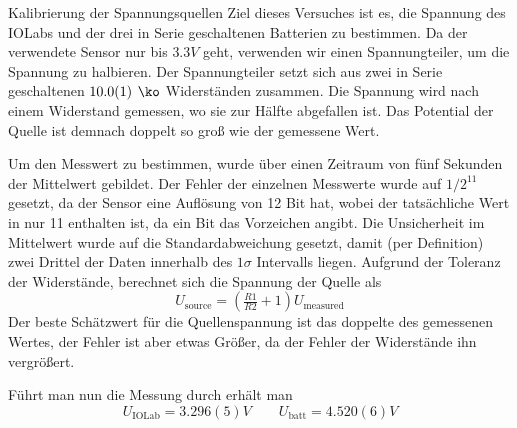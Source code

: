 \documentclass{alex_gp}
\begin{document}
\begin{mybox}{Kalibrierung der Spannungsquellen}
	Ziel dieses Versuches ist es, die Spannung des IOLabs und der drei in Serie geschaltenen Batterien zu bestimmen. Da der verwendete Sensor nur bis \( 3.3 \unit{V} \) geht, verwenden wir einen Spannungteiler, um die Spannung zu halbieren. Der Spannungteiler setzt sich aus zwei in Serie geschaltenen \( 10.0(1) \unit{\ko} \) Widerständen zusammen. Die Spannung wird nach einem Widerstand gemessen, wo sie zur Hälfte abgefallen ist. Das Potential der Quelle ist demnach doppelt so groß wie der gemessene Wert.
	
	Um den Messwert zu bestimmen, wurde über einen Zeitraum von fünf Sekunden der Mittelwert gebildet. Der Fehler der einzelnen Messwerte wurde auf \( 1/2^{11} \) gesetzt, da der Sensor eine Auflösung von 12 Bit hat, wobei der tatsächliche Wert in nur 11 enthalten ist, da ein Bit das Vorzeichen angibt. Die Unsicherheit im Mittelwert wurde auf die Standardabweichung gesetzt, damit (per Definition) zwei Drittel der Daten innerhalb des \( 1\sigma \) Intervalls liegen. Aufgrund der Toleranz der Widerstände, berechnet sich die Spannung der Quelle als
	\begin{equation}\label{eqn:1}
		U_{\text{source}} = \left(\tfrac{R1}{R2} + 1\right) U_{\text{measured}}
	\end{equation}
	Der beste Schätzwert für die Quellenspannung ist das doppelte des gemessenen Wertes, der Fehler ist aber etwas Größer, da der Fehler der Widerstände ihn vergrößert.
	
	Führt man nun die Messung durch erhält man 
	\begin{equation}\label{key}
		U_{\text{IOLab}} = 3.296(5) \unit{V} \qquad U_{\text{batt}} = 4.520(6) \unit{V} 
	\end{equation}
\end{mybox}
\end{document}
